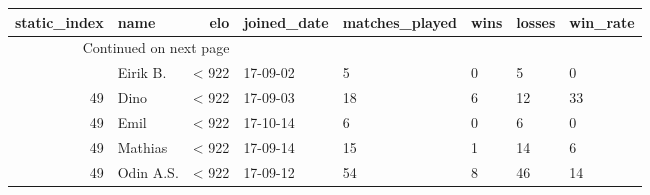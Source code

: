\begin{longtable}{|r|l|r|l|l|l|l|l|}
\toprule
 static\_index &       name &    elo & joined\_date &  matches\_played &  wins &  losses &  win\_rate \\
\midrule
\endhead
\midrule
\multicolumn{3}{r}{{Continued on next page}} \\
\midrule
\endfoot

\bottomrule
\endlastfoot
           49 &   Eirik B. &  < 922 &    17-09-02 &               5 &     0 &       5 &         0 \\
           49 &       Dino &  < 922 &    17-09-03 &              18 &     6 &      12 &        33 \\
           49 &       Emil &  < 922 &    17-10-14 &               6 &     0 &       6 &         0 \\
           49 &    Mathias &  < 922 &    17-09-14 &              15 &     1 &      14 &         6 \\
           49 &  Odin A.S. &  < 922 &    17-09-12 &              54 &     8 &      46 &        14 \\
\end{longtable}
